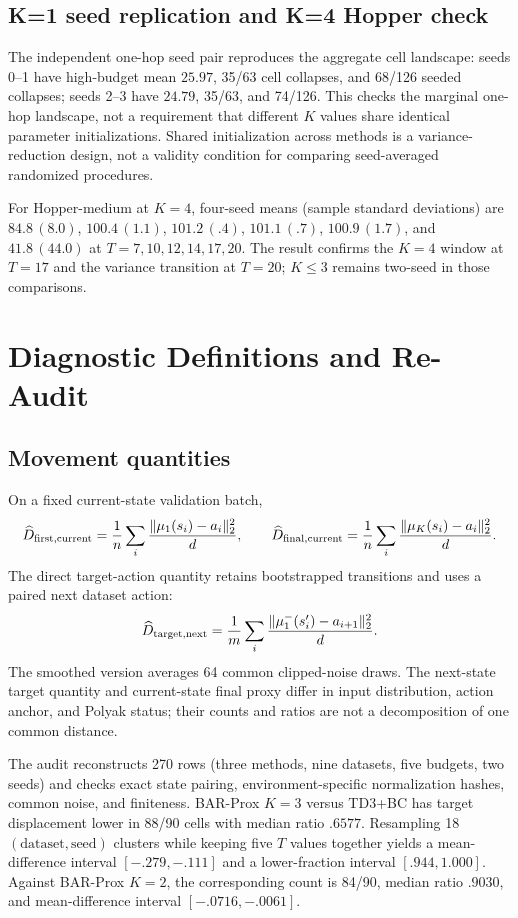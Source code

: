 \documentclass[letterpaper]{article}
\begin{document}
\subsection{K=1 seed replication and K=4 Hopper check}
The independent one-hop seed pair reproduces the aggregate cell landscape: seeds 0--1 have high-budget mean $25.97$, 35/63 cell collapses, and 68/126 seeded collapses; seeds 2--3 have $24.79$, 35/63, and 74/126. This checks the marginal one-hop landscape, not a requirement that different $K$ values share identical parameter initializations. Shared initialization across methods is a variance-reduction design, not a validity condition for comparing seed-averaged randomized procedures.

For Hopper-medium at $K=4$, four-seed means (sample standard deviations) are $84.8\,(8.0)$, $100.4\,(1.1)$, $101.2\,(.4)$, $101.1\,(.7)$, $100.9\,(1.7)$, and $41.8\,(44.0)$ at $T=7,10,12,14,17,20$. The result confirms the $K=4$ window at $T=17$ and the variance transition at $T=20$; $K\le3$ remains two-seed in those comparisons.

\section{Diagnostic Definitions and Re-Audit}
\label{app:audit}

\subsection{Movement quantities}
On a fixed current-state validation batch,
\begin{equation}
\widehat D_{\rm first,current}=\frac1n\sum_i\frac{\|\mu_1(s_i)-a_i\|_2^2}{d},\qquad
\widehat D_{\rm final,current}=\frac1n\sum_i\frac{\|\mu_K(s_i)-a_i\|_2^2}{d}.
\end{equation}
The direct target-action quantity retains bootstrapped transitions and uses a paired next dataset action:
\begin{equation}
\widehat D_{\rm target,next}=\frac1m\sum_i\frac{\|\mu_1^-(s_i')-a_{i+1}\|_2^2}{d}.
\end{equation}
The smoothed version averages 64 common clipped-noise draws. The next-state target quantity and current-state final proxy differ in input distribution, action anchor, and Polyak status; their counts and ratios are not a decomposition of one common distance.

The audit reconstructs 270 rows (three methods, nine datasets, five budgets, two seeds) and checks exact state pairing, environment-specific normalization hashes, common noise, and finiteness. BAR-Prox $K=3$ versus TD3+BC has target displacement lower in 88/90 cells with median ratio $.6577$. Resampling 18 $(\text{dataset},\text{seed})$ clusters while keeping five $T$ values together yields a mean-difference interval $[-.279,-.111]$ and a lower-fraction interval $[.944,1.000]$. Against BAR-Prox $K=2$, the corresponding count is 84/90, median ratio $.9030$, and mean-difference interval $[-.0716,-.0061]$.
\end{document}
